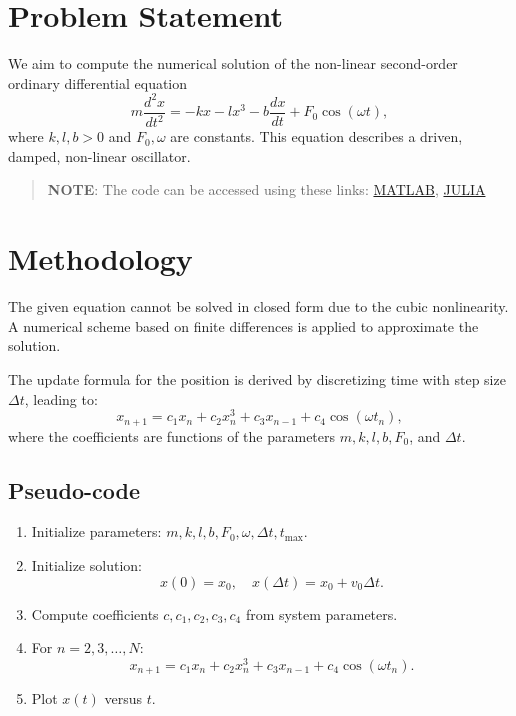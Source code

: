 \section*{Problem Statement}
We aim to compute the numerical solution of the non-linear second-order ordinary differential equation
\[
    m \frac{d^2x}{dt^2} = -kx - lx^3 - b\frac{dx}{dt} + F_0 \cos(\omega t),
\]
where $k, l, b > 0$ and $F_0, \omega$ are constants. This equation describes a driven, damped, non-linear oscillator.

\begin{quote}
  \textbf{NOTE}: The code can be accessed using these links: \href{https://raw.githubusercontent.com/HavokSahil/computational-techniques-assignments/refs/heads/main/assignment0/a1_non_linear_ode.m}{MATLAB}, \href{https://raw.githubusercontent.com/HavokSahil/computational-techniques-assignments/refs/heads/main/assignment0/a1_non_linear_ode.jl}{JULIA}
\end{quote}

\section*{Methodology}
The given equation cannot be solved in closed form due to the cubic nonlinearity. A numerical scheme based on finite differences is applied to approximate the solution.

The update formula for the position is derived by discretizing time with step size $\Delta t$, leading to:
\[
    x_{n+1} = c_1 x_n + c_2 x_n^3 + c_3 x_{n-1} + c_4 \cos(\omega t_n),
\]
where the coefficients are functions of the parameters $m, k, l, b, F_0$, and $\Delta t$.

\subsection*{Pseudo-code}
\begin{enumerate}
    \item Initialize parameters: $m, k, l, b, F_0, \omega, \Delta t, t_{\max}$.
    \item Initialize solution:
    \[
        x(0) = x_0, \quad x(\Delta t) = x_0 + v_0 \Delta t.
    \]
    \item Compute coefficients $c, c_1, c_2, c_3, c_4$ from system parameters.
    \item For $n = 2,3,\dots,N$:
    \[
        x_{n+1} = c_1 x_n + c_2 x_n^3 + c_3 x_{n-1} + c_4 \cos(\omega t_n).
    \]
    \item Plot $x(t)$ versus $t$.
\end{enumerate}

